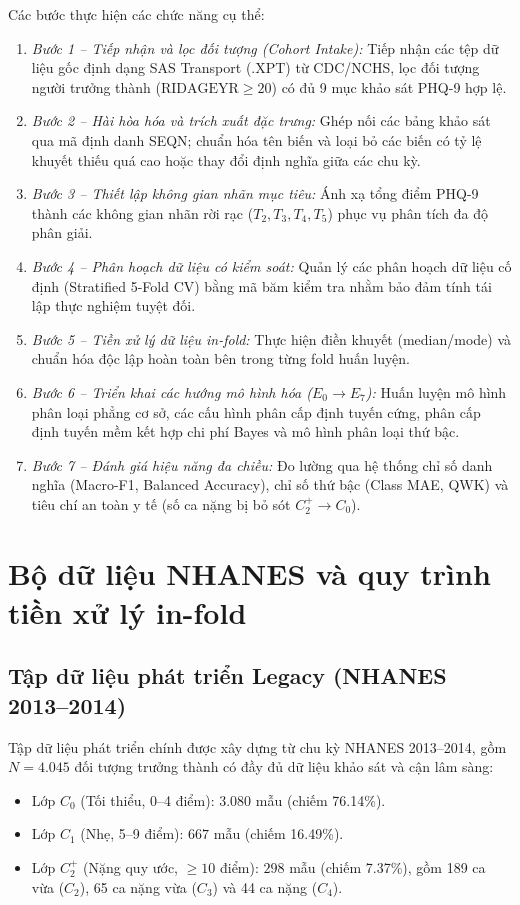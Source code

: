 Các bước thực hiện các chức năng cụ thể:
\begin{enumerate}
    \item \textit{Bước 1 -- Tiếp nhận và lọc đối tượng (Cohort Intake):} Tiếp nhận các tệp dữ liệu gốc định dạng SAS Transport (.XPT) từ CDC/NCHS, lọc đối tượng người trưởng thành ($\text{RIDAGEYR} \ge 20$) có đủ 9 mục khảo sát PHQ-9 hợp lệ.
    \item \textit{Bước 2 -- Hài hòa hóa và trích xuất đặc trưng:} Ghép nối các bảng khảo sát qua mã định danh SEQN; chuẩn hóa tên biến và loại bỏ các biến có tỷ lệ khuyết thiếu quá cao hoặc thay đổi định nghĩa giữa các chu kỳ.
    \item \textit{Bước 3 -- Thiết lập không gian nhãn mục tiêu:} Ánh xạ tổng điểm PHQ-9 thành các không gian nhãn rời rạc ($T_2, T_3, T_4, T_5$) phục vụ phân tích đa độ phân giải.
    \item \textit{Bước 4 -- Phân hoạch dữ liệu có kiểm soát:} Quản lý các phân hoạch dữ liệu cố định (Stratified 5-Fold CV) bằng mã băm kiểm tra nhằm bảo đảm tính tái lập thực nghiệm tuyệt đối.
    \item \textit{Bước 5 -- Tiền xử lý dữ liệu in-fold:} Thực hiện điền khuyết (median/mode) và chuẩn hóa độc lập hoàn toàn bên trong từng fold huấn luyện.
    \item \textit{Bước 6 -- Triển khai các hướng mô hình hóa ($E_0 \to E_7$):} Huấn luyện mô hình phân loại phẳng cơ sở, các cấu hình phân cấp định tuyến cứng, phân cấp định tuyến mềm kết hợp chi phí Bayes và mô hình phân loại thứ bậc.
    \item \textit{Bước 7 -- Đánh giá hiệu năng đa chiều:} Đo lường qua hệ thống chỉ số danh nghĩa (Macro-F1, Balanced Accuracy), chỉ số thứ bậc (Class MAE, QWK) và tiêu chí an toàn y tế (số ca nặng bị bỏ sót $C_2^+ \to C_0$).
\end{enumerate}

\section{Bộ dữ liệu NHANES và quy trình tiền xử lý in-fold}
\label{sec:du-lieu-nghien-cuu}

\subsection{Tập dữ liệu phát triển Legacy (NHANES 2013--2014)}
\label{subsec:legacy-cohort}

Tập dữ liệu phát triển chính được xây dựng từ chu kỳ NHANES 2013--2014, gồm $N = 4.045$ đối tượng trưởng thành có đầy đủ dữ liệu khảo sát và cận lâm sàng:
\begin{itemize}
    \item Lớp $C_0$ (Tối thiểu, 0--4 điểm): $3.080$ mẫu (chiếm 76.14\%).
    \item Lớp $C_1$ (Nhẹ, 5--9 điểm): $667$ mẫu (chiếm 16.49\%).
    \item Lớp $C_2^+$ (Nặng quy ước, $\ge 10$ điểm): $298$ mẫu (chiếm 7.37\%), gồm 189 ca vừa ($C_2$), 65 ca nặng vừa ($C_3$) và 44 ca nặng ($C_4$).
\end{itemize}

